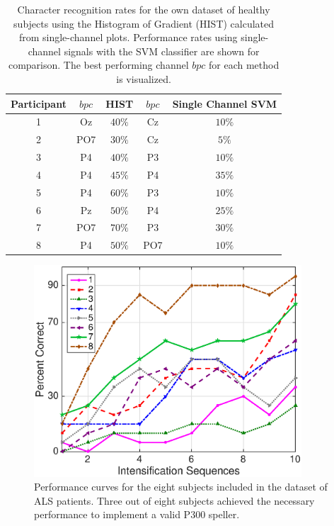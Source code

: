 \begin{table}[htb]
\caption[Single Channel Character Recognition Rates for Healthy Subject's Dataset]{Character recognition rates for the own dataset of healthy subjects using the Histogram of Gradient (HIST) calculated from  single-channel plots.  Performance rates using single-channel signals with the SVM classifier are shown for comparison.  The best performing channel $bpc$ for each method is visualized.}
\centering
\begin{tabular}{c|cc|cc}
\toprule
\textbf{Participant}	&  $bpc$	&  HIST &  $bpc$	&  Single Channel SVM \\
\midrule
1     &     Oz   &   $40\%$  &  Cz   &  $10\%$    \\
2     &     PO7   &   $30\%$      &  Cz   & $5\%$   \\
3     &     P4   &   $40\%$    &  P3   & $10\%$    \\
4     &     P4 &   $45\%$    &  P4   & $35\%$     \\
5     &     P4 &   $60\%$  &  P3   & $10\%$     \\
6     &     Pz &   $50\%$ &  P4   & $25\%$     \\
7     &     PO7 &   $70\%$  &  P3   & $30\%$     \\
8     &     P4 &   $50\%$    &  PO7   & $10\%$    \\

\end{tabular}
\label{tab:resultsown}
\end{table}



\begin{figure}[h!]
\centering
\includegraphics[width=10cm]{images/performance.eps}
\caption[P300 Performance Curves]{Performance curves for the eight subjects included in the dataset of ALS patients.  Three out of eight subjects achieved the necessary performance to implement a valid P300 speller.}
\label{fig:performance}
\end{figure}


